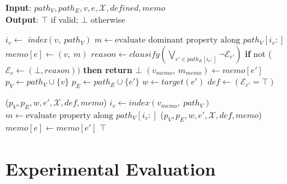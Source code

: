 \documentclass[a4paper,fleqn]{cas-sc}
\begin{document}
\begin{algorithm}[htb]
\caption{\textbf{\nocmemo}}
\small
\textbf{Input}: $path_V, path_E, v, e, \mathcal{X}, \textit{defined}, \textit{memo}$ \\
\textbf{Output}: $\top$ if valid; $\bot$ otherwise
\begin{algorithmic}[1]
        \STATE $i_v \gets$ \textit{index}$(v,\ path_V)$
        \STATE $m \gets \text{evaluate dominant property along } path_V[i_v:]$
        \STATE $\textit{memo}[e] \gets (v,\ m)$ \label{alg:nocmemo:update}
            \STATE $\textit{reason} \gets \textit{clausify}(\bigvee_{e' \in path_E[i_v:]} \neg \mathcal{E}_{e'})$
            \STATE \textbf{if }not ($\mathcal{E}_e \gets (\bot, \textit{reason}))$ \textbf{then return $\bot$}
        \ENDIF
            \STATE $(v_{memo},\ m_{memo}) \gets \textit{memo}[e']$
            \STATE $p_V \gets path_V \cup \{v\}$
            \STATE $p_E \gets path_E \cup \{e'\}$
            \STATE $w \gets \textit{target}(e')$
            \STATE $\textit{def} \gets (\mathcal{E}_{e'} = \top)$

                \STATE \nocmemo($p_V, p_E, w, e', \mathcal{X}, \textit{def}, \textit{memo}$)\label{alg:nocmemo:check1}
            \ELSE
                \STATE $i_v \gets \textit{index}(v_{memo},\ path_V)$
                \STATE $m \gets \text{evaluate property along } path_V[i_v:]$
                    \STATE \nocmemo($p_V, p_E, w, e', \mathcal{X}, \textit{def}, \textit{memo}$)\label{alg:nocmemo:check2}
                \ELSE
                    \STATE $\textit{memo}[e] \gets \textit{memo}[e']$
                \ENDIF
            \ENDIF
        \ENDFOR
    \ENDIF
    \RETURN $\top$
\end{algorithmic}
\label{alg:nocmemo}
\end{algorithm}


\section{Experimental Evaluation}\label{sec:experiments}

\end{document}
